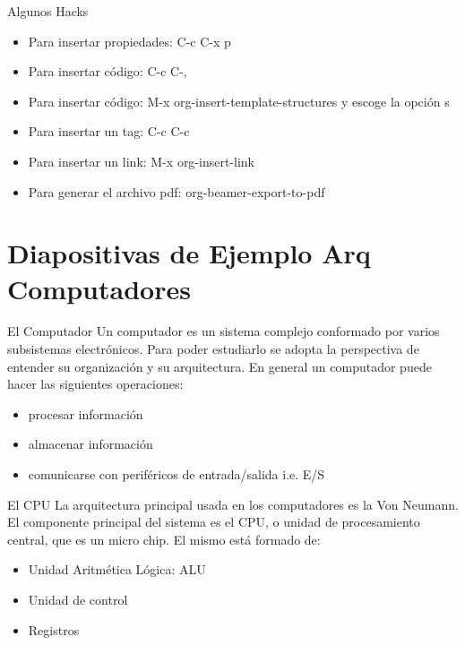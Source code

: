 \documentclass[presentation]{beamer}
\begin{document}
\begin{frame}[allowframebreaks]{Algunos Hacks}
\begin{itemize}
\item Para insertar propiedades: C-c C-x p
\item Para insertar código: C-c C-,
\item Para insertar código: M-x org-insert-template-structures y escoge la opción s
\item Para insertar un tag: C-c C-c
\item Para insertar un link: M-x org-insert-link
\item Para generar el archivo pdf: org-beamer-export-to-pdf
\end{itemize}
\end{frame}

\section{Diapositivas de Ejemplo Arq Computadores}
\label{sec:org92b4d5c}
\begin{frame}[label={sec:orgfd7e305}]{El Computador}
Un computador es un sistema complejo conformado por varios subsistemas
electrónicos. Para poder estudiarlo se adopta la perspectiva de
entender su organización y su arquitectura. En general un computador
puede hacer las siguientes operaciones:

\begin{itemize}
\item procesar información
\item almacenar información
\item comunicarse con periféricos de entrada/salida i.e. E/S
\end{itemize}
\end{frame}

\begin{frame}[label={sec:org8e8f4eb}]{El CPU}
La arquitectura principal usada en los computadores es la Von
Neumann. El componente principal del sistema es el CPU, o unidad de
procesamiento central, que es un micro chip. El mismo está formado de:

\begin{itemize}
\item Unidad Aritmética Lógica: ALU
\item Unidad de control
\item Registros
\end{itemize}
\end{frame}
\end{document}
